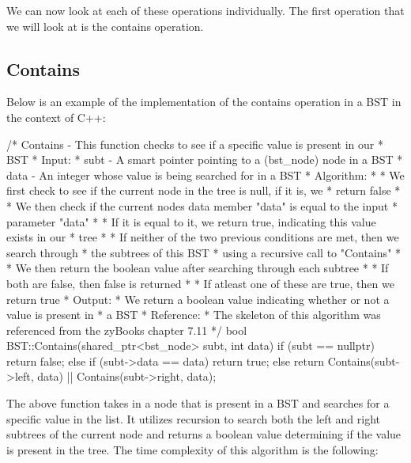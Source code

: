 We can now look at each of these operations individually. The first operation that we will look at is the contains operation.

\begin{highlight}

\subsection*{Contains}

Below is an example of the implementation of the contains operation in a BST in the context of C++:

\begin{code}
/*  Contains - This function checks to see if a specific value is present in our 
*              BST
*   Input:
*     subt - A smart pointer pointing to a (bst_node) node in a BST
*     data - An integer whose value is being searched for in a BST
*   Algorithm:
*     * We first check to see if the current node in the tree is null, if it is, we 
*       return false
*     * We then check if the current nodes data member "data" is equal to the input 
*       parameter "data"
*       * If it is equal to it, we return true, indicating this value exists in our 
*         tree
*     * If neither of the two previous conditions are met, then we search through 
*       the subtrees of this BST
*       using a recursive call to "Contains"
*       * We then return the boolean value after searching through each subtree
*         * If both are false, then false is returned
*         * If atleast one of these are true, then we return true
*   Output:
*     We return a boolean value indicating whether or not a value is present in 
*     a BST
*   Reference:
*     The skeleton of this algorithm was referenced from the zyBooks chapter 7.11
*/
bool BST::Contains(shared_ptr<bst_node> subt, int data){
    if (subt == nullptr) {
        return false;
    }
    else if (subt->data == data) {
        return true;
    }
    else {
        return Contains(subt->left, data) || Contains(subt->right, data);
    }
}
\end{code}

The above function takes in a node that is present in a BST and searches for a specific value in the list. It utilizes recursion to search both the left and right subtrees of the current node and
returns a boolean value determining if the value is present in the tree. The time complexity of this algorithm is the following: \newline


\end{highlight}
